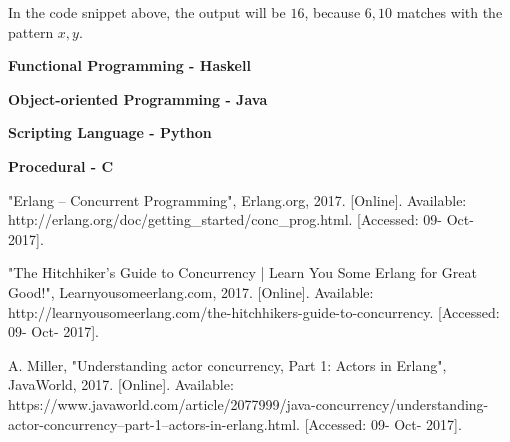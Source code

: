 \documentclass[conference]{IEEEtran}
\begin{document}
In the code snippet above, the output will be $16$, because ${6, 10}$ matches with the pattern ${x,y}$.

\hfill

\textbf{ Functional Programming - Haskell }

\textbf{ Object-oriented Programming - Java }

\textbf{ Scripting Language - Python }

\textbf{ Procedural - C }

\begin{thebibliography}{00}
 "Erlang -- Concurrent Programming", Erlang.org, 2017. [Online]. Available: http://erlang.org/doc/getting\_started/conc\_prog.html. [Accessed: 09- Oct- 2017].

 "The Hitchhiker's Guide to Concurrency | Learn You Some Erlang for Great Good!", Learnyousomeerlang.com, 2017. [Online]. Available: http://learnyousomeerlang.com/the-hitchhikers-guide-to-concurrency. [Accessed: 09- Oct- 2017].

 A. Miller, "Understanding actor concurrency, Part 1: Actors in Erlang", JavaWorld, 2017. [Online]. Available: https://www.javaworld.com/article/2077999/java-concurrency/understanding-actor-concurrency--part-1--actors-in-erlang.html. [Accessed: 09- Oct- 2017].
\end{thebibliography}
\end{document}
